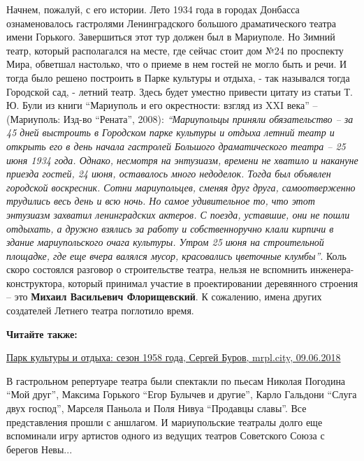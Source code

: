 Начнем, пожалуй, с его истории. Лето 1934 года в городах Донбасса
ознаменовалось гастролями Ленинградского большого драматического театра имени
Горького. Завершиться этот тур должен был в Мариуполе. Но Зимний театр, который
располагался на месте, где сейчас стоит дом №24 по проспекту Мира, обветшал
настолько, что о приеме в нем гостей не могло быть и речи. И тогда было решено
построить в Парке культуры и отдыха, - так назывался тогда Городской сад, -
летний театр. Здесь будет уместно привести цитату из статьи Т. Ю. Були из книги
\enquote{Мариуполь и его окрестности: взгляд из XXΙ века} – (Мариуполь: Изд-во
\enquote{Рената}, 2008): \emph{\enquote{Мариупольцы приняли обязательство – за 45 дней выстроить в
Городском парке культуры и отдыха летний театр и открыть его в день начала
гастролей Большого драматического театра – 25 июня 1934 года. Однако, несмотря
на энтузиазм, времени не хватило и накануне приезда гостей, 24 июня, оставалось
много недоделок. Тогда был объявлен городской воскресник. Сотни мариупольцев,
сменяя друг друга, самоотверженно трудились весь день и всю ночь. Но самое
удивительное то, что этот энтузиазм захватил ленинградских актеров. С поезда,
уставшие, они не пошли отдыхать, а дружно взялись за работу и собственноручно
клали кирпичи в здание мариупольского очага культуры. Утром 25 июня на
строительной площадке, где еще вчера валялся мусор, красовались цветочные
клумбы}}. Коль скоро состоялся разговор о строительстве театра, нельзя не
вспомнить инженера-конструктора, который принимал участие в проектировании
деревянного строения – это \textbf{Михаил Васильевич Флорищевский}. К сожалению, имена
других создателей Летнего театра поглотило время.

\vspace{0.5cm}
\begin{minipage}{0.9\textwidth}
	
\textbf{Читайте также:}

\href{https://archive.org/details/09_06_2018.sergij_burov.mrpl_city.park_kultury_i_otdyha_sezon_1958_goda}{%
Парк культуры и отдыха: сезон 1958 года, Сергей Буров, mrpl.city, 09.06.2018}
\end{minipage}
\vspace{0.5cm}

В гастрольном репертуаре театра были спектакли по пьесам Николая Погодина \enquote{Мой
друг}, Максима Горького \enquote{Егор Булычев и другие}, Карло Гальдони \enquote{Слуга двух
господ}, Марселя Паньола и Поля Нивуа \enquote{Продавцы славы}. Все представления
прошли с аншлагом. И мариупольские театралы долго еще вспоминали игру артистов
одного из ведущих театров Советского Союза с берегов Невы...

